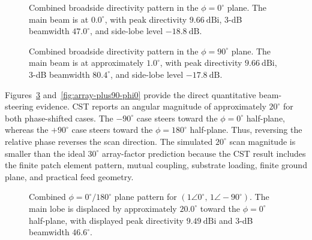 \begin{figure}[H]
    \centering
    \caption[Combined broadside pattern for \(\phi=0^\circ\).]{Combined broadside directivity pattern in the \(\phi=0^\circ\) plane. The main beam is at \(0.0^\circ\), with peak directivity \(9.66~\mathrm{dBi}\), 3-dB beamwidth \(47.0^\circ\), and side-lobe level \(-18.8~\mathrm{dB}\).}
    \label{fig:array-broadside-phi0}
\end{figure}

\begin{figure}[H]
    \centering
    \caption[Combined broadside pattern for \(\phi=90^\circ\).]{Combined broadside directivity pattern in the \(\phi=90^\circ\) plane. The main beam is at approximately \(1.0^\circ\), with peak directivity \(9.66~\mathrm{dBi}\), 3-dB beamwidth \(80.4^\circ\), and side-lobe level \(-17.8~\mathrm{dB}\).}
    \label{fig:array-broadside-phi90}
\end{figure}

Figures~\ref{fig:array-minus90-phi0} and~\ref{fig:array-plus90-phi0} provide the direct
quantitative beam-steering evidence. CST reports an angular magnitude of approximately \(20^\circ\)
for both phase-shifted cases. The \(-90^\circ\) case steers toward the \(\phi=0^\circ\) half-plane,
whereas the \(+90^\circ\) case steers toward the \(\phi=180^\circ\) half-plane. Thus, reversing the
relative phase reverses the scan direction. The simulated \(20^\circ\) scan magnitude is smaller than
the ideal \(30^\circ\) array-factor prediction because the CST result includes the finite patch element
pattern, mutual coupling, substrate loading, finite ground plane, and practical feed geometry.

\begin{figure}[H]
    \centering
    \caption[Steered pattern for a \(-90^\circ\) phase shift.]{Combined \(\phi=0^\circ/180^\circ\) plane pattern for \((1\angle0^\circ,\,1\angle-90^\circ)\). The main lobe is displaced by approximately \(20.0^\circ\) toward the \(\phi=0^\circ\) half-plane, with displayed peak directivity \(9.49~\mathrm{dBi}\) and 3-dB beamwidth \(46.6^\circ\).}
    \label{fig:array-minus90-phi0}
\end{figure}

